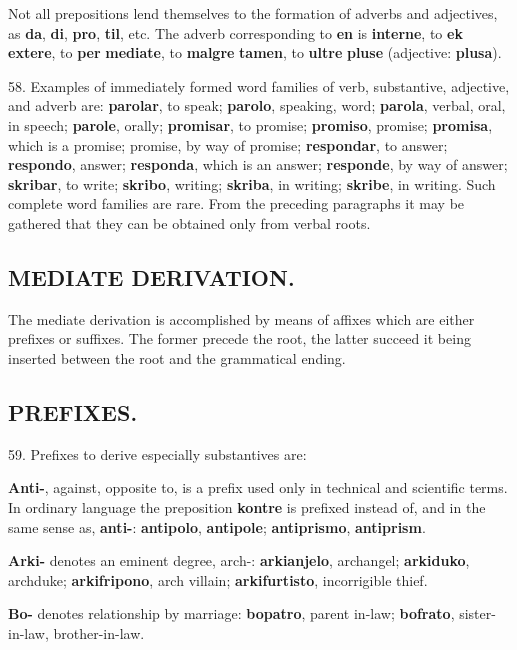 Not all prepositions lend themselves to the formation of adverbs and adjectives, as \textbf{da}, \textbf{di}, \textbf{pro}, \textbf{til}, etc. The adverb corresponding to \textbf{en} is \textbf{interne}, to \textbf{ek} \textbf{extere}, to \textbf{per} \textbf{mediate}, to \textbf{malgre} \textbf{tamen}, to \textbf{ultre} \textbf{pluse} (adjective: \textbf{plusa}). 

58. Examples of immediately formed word families of verb, substantive, adjective, and adverb are: \textbf{parolar}, to speak; \textbf{parolo}, speaking, word; \textbf{parola}, verbal, oral, in speech; \textbf{parole}, orally; \textbf{promisar}, to promise; \textbf{promiso}, promise; \textbf{promisa}, which is a promise; promise, by way of promise; \textbf{respondar}, to answer; \textbf{respondo}, answer; \textbf{responda}, which is an answer; \textbf{responde}, by way of answer; \textbf{skribar}, to write; \textbf{skribo}, writing; \textbf{skriba}, in writing; \textbf{skribe}, in writing. Such complete word families are rare. From the preceding paragraphs it may be gathered that they can be obtained only from verbal roots. 
\subsection*{MEDIATE DERIVATION.}
The mediate derivation is accomplished by means of affixes which are either prefixes or suffixes. The former precede the root, the latter succeed it being inserted between the root and the grammatical ending.
\subsection*{PREFIXES.}
59. Prefixes to derive especially substantives are: 

\textbf{Anti-}, against, opposite to, is a prefix used only in technical and scientific terms. In ordinary language the preposition \textbf{kontre} is prefixed instead of, and in the same sense as, \textbf{anti-}: \textbf{antipolo}, \textbf{antipole}; \textbf{antiprismo}, \textbf{antiprism}. 

\textbf{Arki-} denotes an eminent degree, arch-: \textbf{arkianjelo}, archangel; \textbf{arkiduko}, archduke; \textbf{arkifripono}, arch villain; \textbf{arkifurtisto}, incorrigible thief. 

\textbf{Bo-} denotes relationship by marriage: \textbf{bopatro}, parent in-law; \textbf{bofrato}, sister-in-law, brother-in-law. 

